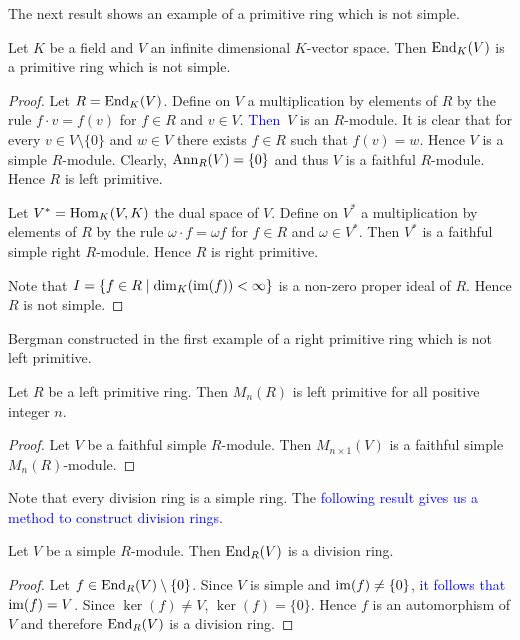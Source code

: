 The next result shows an example of a primitive ring which is not simple.

\begin{proposition}\label{Prop1.2.2}
Let $K$ be a field and $V$ an infinite dimensional $K$-vector space. Then
$\operatorname{End}_K(V)$ is a primitive ring which is not simple.
\end{proposition}

\begin{proof}
Let $R=\operatorname{End}_K(V)$. Define on $V$ a multiplication by elements of $R$ by the rule 
$f\cdot v=f(v)$ for $f\in R$ and $v\in V$.
\textcolor{blue}{Then} $V$ is an $R$-module.
It is clear that for every $v\in V\setminus \{ 0\}$ and $w\in V$ there exists
$f\in R$ such that $f(v)=w$. Hence $V$ is a simple $R$-module. Clearly, 
$\operatorname{Ann}_R(V)=\{0\}$ and thus $V$ is a faithful $R$-module. 
Hence $R$ is left primitive.

Let $V^*=\operatorname{Hom}_K(V,K)$ the dual space of $V$. Define on $V^*$ a multiplication by elements of $R$ by the rule  
$\omega\cdot f=\omega f$ for $f\in R$ and $\omega\in V^*$. Then $V^*$ is a
faithful simple right $R$-module. Hence $R$ is right primitive.

Note that $I=\{ f\in R\mid \dim_K(\operatorname{im}(f))<\infty\}$ 
is a non-zero proper ideal of $R$. 
Hence $R$ is not simple. 
\end{proof}

Bergman constructed in \cite{MR175940,MR167497} 
the first example of a right primitive ring which is not left primitive. 

\begin{proposition}
\label{Prop1.2.3}
Let $R$ be a left primitive ring. Then $M_n(R)$ is left primitive for all positive integer $n$.
\end{proposition}

\begin{proof}
Let $V$ be a faithful simple $R$-module. Then $M_{n\times 1}(V)$ is a faithful simple $M_n(R)$-module.
\end{proof}



Note that every division ring is a simple ring. The \textcolor{blue}{following result gives us a method to construct division rings.}

\begin{lemma}[Schur]
Let $V$ be a simple $R$-module. Then $\operatorname{End}_R(V)$ is a division ring.
\end{lemma}

\begin{proof}
Let $f\in \operatorname{End}_R(V)\setminus \{ 0\}$. Since $V$ is simple and $\operatorname{im}(f)\neq\{0\}$, \textcolor{blue}{it follows that} $\operatorname{im}(f)=V$. Since
$\ker(f)\neq V$, $\ker(f)=\{0\}$. Hence $f$ is an automorphism of $V$ and therefore $\operatorname{End}_R(V)$ is a division ring.
\end{proof}

